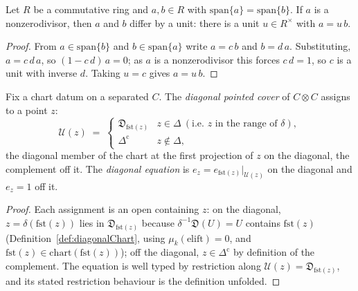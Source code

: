 \begin{lemma}
  \label{lem:exists_isUnit_of_span_singleton_eq}
  \leanok
  Let \(R\) be a commutative ring and \(a, b \in R\) with \(\mathrm{span}\{a\} = \mathrm{span}\{b\}\).
  If \(a\) is a nonzerodivisor, then \(a\) and \(b\) differ by a unit: there is a unit \(u \in
  R^{\times}\) with \(a = u\,b\).
\end{lemma}
\begin{proof}
  \leanok
  From \(a \in \mathrm{span}\{b\}\) and \(b \in \mathrm{span}\{a\}\) write \(a = c\,b\) and \(b =
  d\,a\). Substituting, \(a = c\,d\,a\), so \((1 - c\,d)\,a = 0\); as \(a\) is a nonzerodivisor this
  forces \(c\,d = 1\), so \(c\) is a unit with inverse \(d\). Taking \(u = c\) gives \(a = u\,b\).
\end{proof}

\begin{definition}
  \label{def:diagonalCover}
  \leanok
  Fix a chart datum on a separated \(C\). The \emph{diagonal pointed cover} of \(C \otimes C\)
  assigns to a point \(z\):
  \[
    \mathcal U(z) \;=\;
      \begin{cases}
        \mathfrak D_{\mathrm{fst}(z)} & z \in \Delta \ (\text{i.e. } z \text{ in the range of } \delta),\\
        \Delta^{\mathrm c} & z \notin \Delta,
      \end{cases}
  \]
  the diagonal member of the chart at the first projection of \(z\) on the diagonal, the complement
  off it. The \emph{diagonal equation} is \(e_z = e_{\mathrm{fst}(z)}|_{\mathcal U(z)}\) on the
  diagonal and \(e_z = 1\) off it.
\end{definition}
\begin{proof}
  \leanok
  Each assignment is an open containing \(z\): on the diagonal, \(z = \delta(\mathrm{fst}(z))\)
  lies in \(\mathfrak D_{\mathrm{fst}(z)}\) because \(\delta^{-1}\mathfrak D(U) = U\) contains
  \(\mathrm{fst}(z)\) (Definition~\ref{def:diagonalChart}, using \(\mu_k(\mathrm{elift}) = 0\), and
  \(\mathrm{fst}(z) \in \mathrm{chart}(\mathrm{fst}(z))\)); off the diagonal, \(z \in
  \Delta^{\mathrm c}\) by definition of the complement. The equation is well typed by restriction
  along \(\mathcal U(z) = \mathfrak D_{\mathrm{fst}(z)}\), and its stated restriction behaviour is
  the definition unfolded.
\end{proof}

